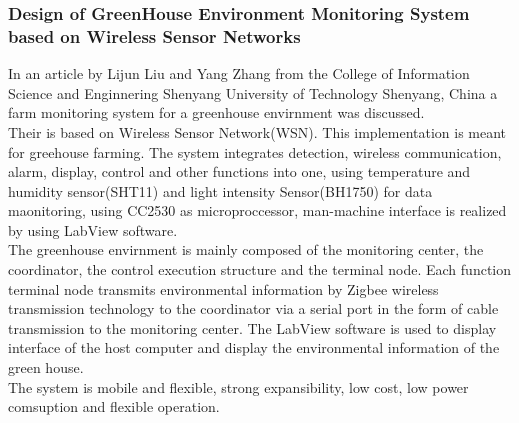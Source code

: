 \documentclass[12pt, a4paper]{article}
\begin{document}
\subsubsection{Design of GreenHouse Environment Monitoring System based on Wireless Sensor Networks}
In an article by Lijun Liu and Yang Zhang from the College of Information Science and Enginnering Shenyang University of Technology Shenyang, China a farm monitoring system for a greenhouse envirnment was discussed.\\
Their is based on Wireless Sensor Network(WSN). This implementation is meant for greehouse farming. The system integrates detection, wireless communication, alarm, display, control and other functions into one, using temperature and humidity sensor(SHT11) and light intensity Sensor(BH1750) for data maonitoring, using CC2530 as microproccessor, man-machine interface is realized by using LabView software.\\ 
The greenhouse envirnment is mainly composed of the monitoring center, the coordinator, the control execution structure and the terminal node. Each function terminal node  transmits environmental information by Zigbee wireless transmission technology to the coordinator via a serial port in the form of cable transmission to the monitoring center. The LabView software is used to display interface of the host computer and display the environmental information of the green house. \\
The system is mobile and flexible, strong expansibility, low cost, low power comsuption and flexible operation.
\end{document}
